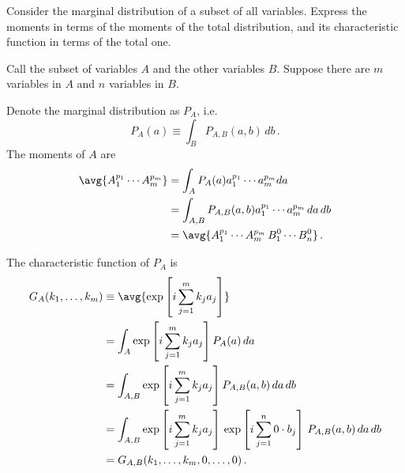 

Consider the marginal distribution of a subset of all variables.
Express the moments in terms of the moments of the total distribution, and its characteristic function in terms of the total one.


Call the subset of variables $A$ and the other variables $B$.
Suppose there are $m$ variables in $A$ and $n$ variables in $B$.

Denote the marginal distribution as $P_A$, i.e.
\begin{equation*}
  P_A(a) \equiv \int_B P_{A,B}(a, b) \, db
  \, .
\end{equation*}
The moments of $A$ are
\begin{align*}
  \avg{A_1^{p_1} \cdots A_m^{p_m}}
  &= \int_A P_A(a) a_1^{p_1} \cdots a_m^{p_m} da \\
  &= \int_{A,B} P_{A,B}(a, b) a_1^{p_1} \cdots a_m^{p_m} \, da \, db \\
  &= \avg{A_1^{p_1} \cdots A_m^{p_m} \, B_1^0 \cdots B_n^0}
  \, .
\end{align*}

The characteristic function of $P_A$ is
\begin{align*}
  G_A(k_1, \ldots ,k_m)
  & \equiv \avg{\exp\left[i \sum_{j=1}^m k_j a_j \right]} \\
  &= \int_A \exp\left[i \sum_{j=1}^m k_j a_j \right] P_A(a) \, da \\
  &= \int_{A,B} \exp\left[i \sum_{j=1}^m k_j a_j \right] P_{A,B}(a, b) \, da \, db \\
  &= \int_{A,B}
  \exp \left[i \sum_{j=1}^m k_j a_j \right] \,
  \exp \left[i \sum_{j=1}^n 0 \cdot b_j \right]
  \, P_{A,B}(a, b) \, da \, db \\
  &= G_{A,B}(k_1, \ldots, k_m, 0, \ldots, 0)
  \, .
\end{align*}
